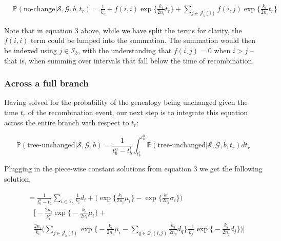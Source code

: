 \documentclass[11pt]{article}
\begin{document}

\begin{equation}\tag{3}
\begin{aligned}
	&\mathbb{P}(\text{no-change} | \mathcal{S},\mathcal{G},b,t_r) = 
	\frac{1}{k_i} + f(i,i) \exp \bigg\{\frac{k_i}{2n_i} t_r\bigg\} +
	\sum_{j \in \mathcal{J}_b(i)} f(i,j) \exp\bigg\{\frac{k_i}{2n_i}t_r\bigg\} 
\end{aligned}
\end{equation}

\noindent Note that in equation 3 above, while we have split the terms for clarity, 
the $f(i,i)$ term could be lumped into the summation. The summation would then be indexed 
using $j \in \mathcal{I}_b$, with the understanding that $f(i,j)=0$ when $i>j$ -- 
that is, when summing over intervals that fall below the time of recombination.


\subsubsection{Across a full branch}
Having solved for the probability of the genealogy being unchanged given the 
time $t_r$ of the recombination event, our next step is to integrate this equation
across the entire branch with respect to $t_r$:

\begin{equation}
	\mathbb{P}(\text{tree-unchanged} | \mathcal{S}, \mathcal{G}, b) = 
		\frac{1}{t_b^u - t_b^l} 
		\int_{t_b^l}^{t_b^u} 
		\mathbb{P}(\text{tree-unchanged} | \mathcal{S}, \mathcal{G}, b, t_r) dt_r
\end{equation}

\noindent Plugging in the piece-wise constant solutions from equation 3
we get the following solution.

\begin{equation}
\begin{aligned}
	&= \frac{1}{t^u_b-t^l_b}
	\sum_{i \in \mathcal{I}_b}
	\frac{1}{k_i}d_i + 
	\bigg(
		\exp \bigg\{ \frac{k_i}{2n_i} \mu_{i} \bigg\}
		-\exp \bigg\{ \frac{k_i}{2n_i} \sigma_i	\bigg\}
	\bigg)\\
	&~~~~\Bigg[
		-\frac{2n_i}{k_i^2}
		\exp \bigg\{ -\frac{k_i}{2n_i} \mu_{i} \bigg\} + 
		\\
		&~~~~\frac{2n_i}{k_i}
		\Bigg(
			\sum_{j \in \mathcal{J}_b(i)}
			\exp \bigg\{
				-\frac{k_i}{2n_i} \mu_{i} -
				\sum_{q \in \mathcal{Q}_b(i,j)}
				\frac{k_q}{2n_q} d_q
				\bigg\}
			\frac{-1}{k_j} \exp \bigg\{-\frac{k_j}{2n_j} d_j \bigg\}
		\Bigg)
	\Bigg]
\end{aligned}
\end{equation}
\end{document}
